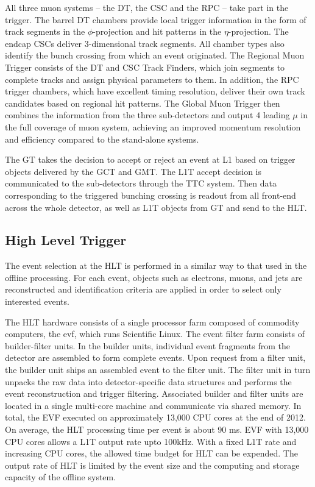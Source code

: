 All three muon systems – the DT, the CSC and the RPC – take part in the trigger. The barrel DT chambers provide local trigger information in the form of track segments in the $\phi$-projection and hit patterns in the $\eta$-projection. The endcap CSCs deliver 3-dimensional track segments. All chamber types also identify the bunch crossing from which an event originated. The Regional Muon Trigger consists of the DT and CSC Track Finders, which join segments to complete tracks and assign physical parameters to them. In addition, the RPC trigger chambers, which have excellent timing resolution, deliver their own track candidates based on regional hit patterns. The Global Muon Trigger then combines the information from the three sub-detectors and output 4 leading $\mu$ in the full coverage of muon system, achieving an improved momentum resolution and efficiency compared to the stand-alone systems.

The GT takes the decision to accept or reject an event at L1 based on trigger objects delivered by the GCT and GMT. The L1T accept decision is communicated to the sub-detectors through the TTC system. Then data corresponding to the triggered bunching crossing is readout from all front-end across the whole detector, as well as L1T objects from GT and send to the HLT.



\subsection{High Level Trigger}

The event selection at the HLT is performed in a similar way to that used in the offline processing. For each event, objects such as electrons, muons, and jets are reconstructed and identification criteria are applied in order to select only interested events.

The HLT hardware consists of a single processor farm composed of commodity computers, the \acrfull{evf}, which runs Scientific Linux. The event filter farm consists of builder-filter units. In the builder units, individual event fragments from the detector are assembled to form complete events. Upon request from a filter unit, the builder unit ships an assembled event to the filter unit. The filter unit in turn unpacks the raw data into detector-specific data structures and performs the event reconstruction and trigger filtering. Associated builder and filter units are located in a single multi-core machine and communicate via shared memory. In total, the EVF executed on approximately 13,000 CPU cores at the end of 2012. On average, the HLT processing time per event is about 90 ms. EVF with 13,000 CPU cores allows a L1T output rate upto 100kHz. With a fixed L1T rate and increasing CPU cores, the allowed time budget for HLT can be expended. The output rate of HLT is limited by the event size and the computing and storage capacity of the offline system.

